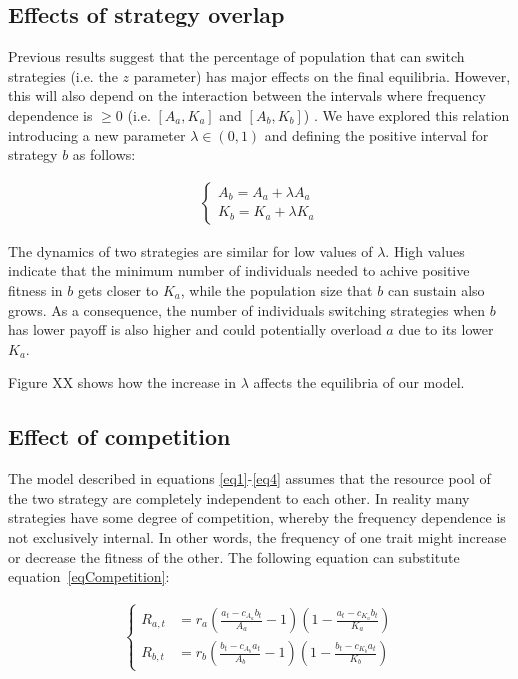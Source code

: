 \documentclass[preprint,authoryear]{elsarticle}
\begin{document}
\subsection{Effects of strategy overlap}

Previous results suggest that the percentage of population that can switch strategies (i.e. the $z$ parameter) has major effects on the final equilibria. However, this will also depend on the interaction between the intervals where frequency dependence is $\geq 0$ (i.e. $[A_a,K_a]$ and $[A_b,K_b]$) . We have explored this relation introducing a new parameter $\lambda \in (0,1)$ and defining the positive interval for strategy $b$ as follows:

\begin{align}
\label{eqOverlap}
\begin{cases}
A_b = A_a + \lambda A_a\\
K_b = K_a + \lambda K_a
\end{cases}
\end{align}

The dynamics of two strategies are similar for low values of $\lambda$. High values indicate that the minimum number of individuals needed to achive positive fitness in $b$ gets closer to $K_a$, while the population size that $b$ can sustain also grows. As a consequence, the number of individuals switching strategies when $b$ has lower payoff is also higher and could potentially overload $a$ due to its lower $K_a$.

Figure XX shows how the increase in $\lambda$ affects the equilibria of our model.


\subsection{Effect of competition}

The model described in equations \ref{eq1}-\ref{eq4} assumes that the resource pool of the two strategy are completely independent to each other. In reality many strategies have some degree of competition, whereby the frequency dependence is not exclusively internal. In other words, the frequency of one trait might increase or decrease the fitness of the other. The following equation can substitute equation~\eqref{eqCompetition}: 

\begin{align}
\begin{cases}
R_{a,t}& = r_a (\frac{a_t-c_{A_a}b_t}{A_a}-1)(1-\frac{a_t-c_{K_a}b_t}{K_a})\\
R_{b,t}& = r_b (\frac{b_t-c_{A_b}a_t}{A_b}-1)(1-\frac{b_t-c_{K_b}a_t}{K_b}) 
\end{cases}
\label{eqCompetition}
\end{align}
\end{document}
